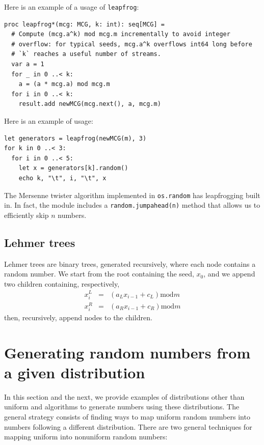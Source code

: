 \documentclass[justified, sixbynine]{tufte-book}
\def\ft{\small\tt}
\theoremstyle{plain}%
\newtheorem * {corollary}{Corollary}
\theoremstyle{definition}
\theoremstyle{remark}
\newtheorem * {remark}{Remark}
\newtheorem * {note}{Note}
\begin{document}
\begin{fullwidth}
Here is an example of a usage of {\ft leapfrog}:

\begin{lstlisting}[caption={in file: {\ft nlib/randomgen.nim}}]
proc leapfrog*(mcg: MCG, k: int): seq[MCG] =
  # Compute (mcg.a^k) mod mcg.m incrementally to avoid integer
  # overflow: for typical seeds, mcg.a^k overflows int64 long before
  # `k` reaches a useful number of streams.
  var a = 1
  for _ in 0 ..< k:
    a = (a * mcg.a) mod mcg.m
  for i in 0 ..< k:
    result.add newMCG(mcg.next(), a, mcg.m)
\end{lstlisting}

Here is an example of usage:
\begin{lstlisting}
let generators = leapfrog(newMCG(m), 3)
for k in 0 ..< 3:
  for i in 0 ..< 5:
    let x = generators[k].random()
    echo k, "\t", i, "\t", x
\end{lstlisting}

The Mersenne twister algorithm implemented in {\ft os.random} has leapfrogging built in. In fact, the module includes a {\ft random.jumpahead(n)} method that allows us to efficiently skip $n$ numbers.

\goodbreak\subsection{Lehmer trees}

Lehmer trees are binary trees, generated recursively, where each node
contains a random number. We start from the root containing the seed, $x_0$, and
we append two children containing, respectively,
\begin{eqnarray}
x_i^L &=&(a_Lx_{i-1}+c_L)\textrm{mod}m \\
x_i^R &=&(a_Rx_{i-1}+c_R)\textrm{mod}m
\end{eqnarray}
then, recursively, append nodes to the children.

\goodbreak\section{Generating random numbers from a given distribution}


In this section and the next, we provide examples of distributions other than uniform and algorithms to generate numbers using these distributions. The general strategy consists of finding ways to map uniform random numbers into numbers following a different distribution. There are two general techniques for mapping uniform into nonuniform random numbers:


\end{fullwidth}
\end{document}
